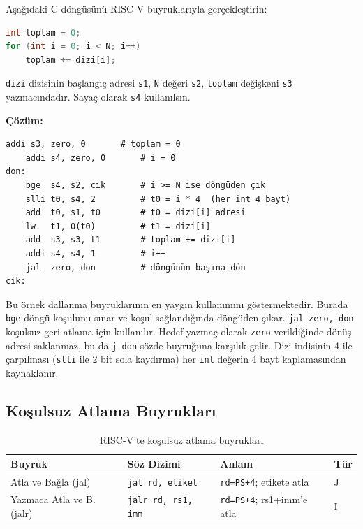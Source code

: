 \begin{ornek}[3.16]
\label{orn:dongu}
Aşağıdaki C döngüsünü RISC-V buyruklarıyla gerçekleştirin:
\begin{lstlisting}[language=C]
int toplam = 0;
for (int i = 0; i < N; i++)
    toplam += dizi[i];
\end{lstlisting}
\texttt{dizi} dizisinin başlangıç adresi \texttt{s1}, \texttt{N} değeri \texttt{s2}, \texttt{toplam} değişkeni \texttt{s3} yazmacındadır. Sayaç olarak \texttt{s4} kullanılsın.

\textbf{Çözüm:}
\begin{lstlisting}[style=riscv]
    addi s3, zero, 0       # toplam = 0
    addi s4, zero, 0       # i = 0
don:
    bge  s4, s2, cik       # i >= N ise döngüden çık
    slli t0, s4, 2         # t0 = i * 4  (her int 4 bayt)
    add  t0, s1, t0        # t0 = dizi[i] adresi
    lw   t1, 0(t0)         # t1 = dizi[i]
    add  s3, s3, t1        # toplam += dizi[i]
    addi s4, s4, 1         # i++
    jal  zero, don         # döngünün başına dön
cik:
\end{lstlisting}

Bu örnek dallanma buyruklarının en yaygın kullanımını göstermektedir. Burada \texttt{bge} döngü koşulunu sınar ve koşul sağlandığında döngüden çıkar. \texttt{jal zero, don} koşulsuz geri atlama için kullanılır. Hedef yazmaç olarak \texttt{zero} verildiğinde dönüş adresi saklanmaz, bu da \texttt{j don} sözde buyruğuna karşılık gelir. Dizi indisinin 4 ile çarpılması (\texttt{slli} ile 2 bit sola kaydırma) her \texttt{int} değerin 4 bayt kaplamasından kaynaklanır.
\end{ornek}

\subsection{Koşulsuz Atlama Buyrukları}

\begin{table}[H]
\centering
\caption{RISC-V'te koşulsuz atlama buyrukları}
\label{tab:atlama-buyruklar}
\begin{tabular}{llll}
\toprule
\textbf{Buyruk} & \textbf{Söz Dizimi} & \textbf{Anlam} & \textbf{Tür} \\
\midrule
Atla ve Bağla (jal)   & \texttt{jal rd, etiket}     & \texttt{rd=PS+4}; etikete atla    & J \\
Yazmaca Atla ve B. (jalr) & \texttt{jalr rd, rs1, imm} & \texttt{rd=PS+4}; rs1+imm'e atla & I \\
\bottomrule
\end{tabular}
\end{table}

